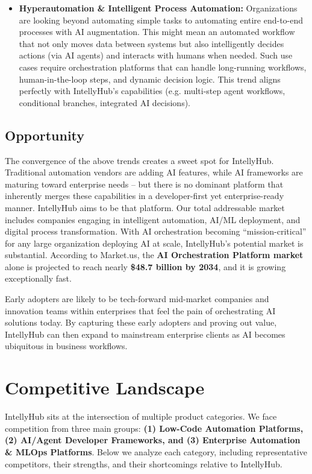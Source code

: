 \begin{itemize}
    \item \textbf{Hyperautomation \& Intelligent Process Automation:} Organizations are looking beyond automating simple tasks to automating entire end-to-end processes with AI augmentation. This might mean an automated workflow that not only moves data between systems but also intelligently decides actions (via AI agents) and interacts with humans when needed. Such use cases require orchestration platforms that can handle long-running workflows, human-in-the-loop steps, and dynamic decision logic. This trend aligns perfectly with IntellyHub's capabilities (e.g. multi-step agent workflows, conditional branches, integrated AI decisions).
\end{itemize}

\subsection{Opportunity}
The convergence of the above trends creates a sweet spot for IntellyHub. Traditional automation vendors are adding AI features, while AI frameworks are maturing toward enterprise needs – but there is no dominant platform that inherently merges these capabilities in a developer-first yet enterprise-ready manner. IntellyHub aims to be that platform. Our total addressable market includes companies engaging in intelligent automation, AI/ML deployment, and digital process transformation. With AI orchestration becoming “mission-critical” for any large organization deploying AI at scale, IntellyHub's potential market is substantial. According to Market.us, the \textbf{AI Orchestration Platform market} alone is projected to reach nearly \textbf{\$48.7 billion by 2034}\cite{AIOrch}, and it is growing exceptionally fast. 

Early adopters are likely to be tech-forward mid-market companies and innovation teams within enterprises that feel the pain of orchestrating AI solutions today. By capturing these early adopters and proving out value, IntellyHub can then expand to mainstream enterprise clients as AI becomes ubiquitous in business workflows.

\section{Competitive Landscape}
IntellyHub sits at the intersection of multiple product categories. We face competition from three main groups: \textbf{(1) Low-Code Automation Platforms, (2) AI/Agent Developer Frameworks, and (3) Enterprise Automation \& MLOps Platforms}. Below we analyze each category, including representative competitors, their strengths, and their shortcomings relative to IntellyHub.

